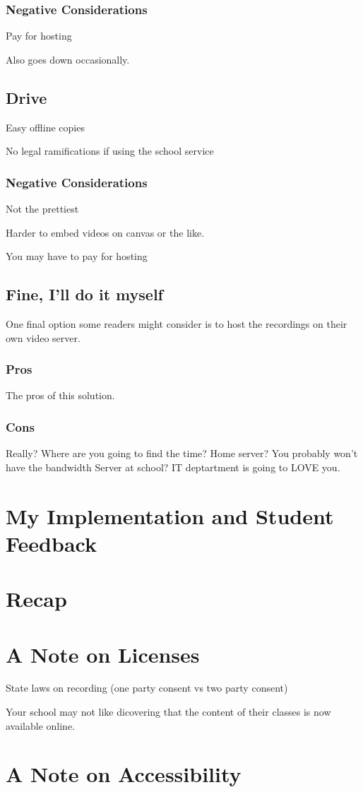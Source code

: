 \documentclass[sigconf]{acmart}
\begin{document}
\subsubsection{Negative Considerations}


Pay for hosting

Also goes down occasionally.

\subsection{Drive}

Easy offline copies

No legal ramifications if using the school service

\subsubsection{Negative Considerations}
Not the prettiest

Harder to embed videos on canvas or the like.

You may have to pay for hosting




\subsection{Fine, I'll do it myself}

One final option some readers might consider is to host the recordings on their own video server.

\subsubsection{Pros}
The pros of this solution.
\subsubsection{Cons}

Really?  Where are you going to find the time?
Home server? You probably won't have the bandwidth
Server at school?  IT deptartment is going to LOVE you.


\section{My Implementation and Student Feedback}

\section{Recap}



\section{A Note on Licenses}

State laws on recording (one party consent vs two party consent)

Your school may not like dicovering that the content of their classes is now available online.

\section{A Note on Accessibility}


\end{document}
